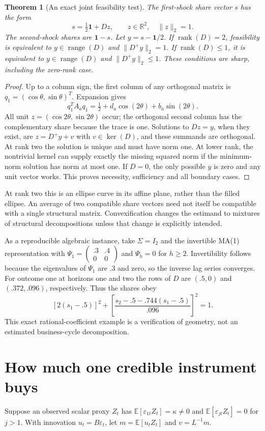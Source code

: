 \documentclass[11pt]{article}
\newtheorem{theorem}{Theorem}
\theoremstyle{remark}
\newcommand{\E}{\mathbb E}
\newcommand{\R}{\mathbb R}
\newcommand{\rank}{\operatorname{rank}}
\newcommand{\range}{\operatorname{range}}
\newcommand{\kerop}{\operatorname{ker}}
\begin{document}
\begin{theorem}[An exact joint feasibility test]
The first-shock share vector $s$ has the form
\[
 s=\tfrac12\mathbf1+Dz,\qquad z\in\R^2,\quad\|z\|_2=1.              \tag{2}
\]
The second-shock shares are $\mathbf1-s$.
Let $y=s-\mathbf1/2$. If $\rank(D)=2$, feasibility is equivalent to
$y\in\range(D)$ and $\|D^+y\|_2=1$. If $\rank(D)\leq1$, it is
equivalent to $y\in\range(D)$ and $\|D^+y\|_2\leq1$.
These conditions are sharp, including the zero-rank case.
\end{theorem}
\begin{proof}
Up to a column sign, the first column of any orthogonal matrix is
$q_1=(\cos\theta,\sin\theta)^T$. Expansion gives
\[
 q_1^TA_aq_1=\tfrac12+d_a\cos(2\theta)+b_a\sin(2\theta).
\]
All unit $z=(\cos2\theta,\sin2\theta)$ occur; the orthogonal second
column has the complementary share because the trace is one.
Solutions to $Dz=y$, when they exist, are $z=D^+y+v$ with
$v\in\kerop(D)$, and these summands are orthogonal. At rank two the
solution is unique and must have norm one. At lower rank, the nontrivial
kernel can supply exactly the missing squared norm if the minimum-norm
solution has norm at most one. If $D=0$, the only possible $y$ is zero
and any unit vector works. This proves necessity, sufficiency and all
boundary cases.
\end{proof}
At rank two this is an ellipse curve in its affine plane, rather than the
filled ellipse. An average of two compatible share vectors need not itself
be compatible with a single structural matrix. Convexification changes
the estimand to mixtures of structural decompositions unless that change
is explicitly intended.

As a reproducible algebraic instance, take $\Sigma=I_2$ and the invertible
MA(1) representation with
$\Psi_1=\left(\begin{smallmatrix}.3&.4\\0&0\end{smallmatrix}\right)$
and $\Psi_h=0$ for $h\geq2$. Invertibility follows because the eigenvalues
of $\Psi_1$ are $.3$ and zero, so the inverse lag series converges.
For outcome one at horizons one and two the rows of $D$ are
$(.5,0)$ and $(.372,.096)$, respectively. Thus the shares obey
\[
 [2(s_1-.5)]^2+
 \left[\frac{s_2-.5-.744(s_1-.5)}{.096}\right]^2=1.                 \tag{3}
\]
This exact rational-coefficient example is a verification of geometry,
not an estimated business-cycle decomposition.

\section{How much one credible instrument buys}
Suppose an observed scalar proxy $Z_t$ has
$\E[\varepsilon_{1t}Z_t]=\kappa\ne0$ and
$\E[\varepsilon_{jt}Z_t]=0$ for $j>1$. With innovation $u_t=B\varepsilon_t$,
let $m=\E[u_tZ_t]$ and $v=L^{-1}m$.
\end{document}
